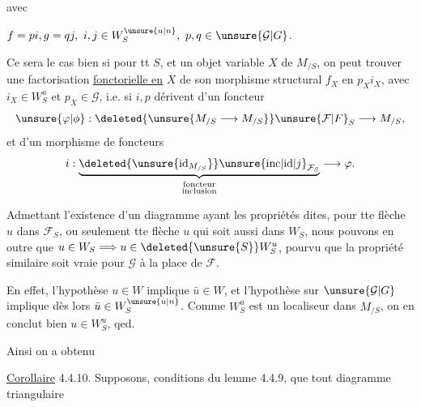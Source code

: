avec


$f=pi,g=qj,\ i,j\in W_S^{\unsure{u|n}},\ p,q\in\unsure{\mathcal{G}|G}$.

Ce sera le cas  bien  si pour tt $S$,  et un objet variable $X$ de $M_{/S}$, on peut trouver une factorisation \uline{fonctorielle en} $X$ de son morphisme structural $f_X$ en $p_X i_X$, avec $i_X\in W_S^u$ et $p_X\in\mathcal{G}$, i.e. si $i,p$ dérivent d'un foncteur
\[
 \unsure{\varphi|\phi}:\deleted{\unsure{M_{/S}\longrightarrow M_{/S}}}\unsure{\mathcal{F}|F}_S\longrightarrow M_{/S},
\]
et d'un morphisme de foncteurs
\[
 i:\underset{\substack{\text{foncteur}\\\text{inclusion}}}{\underbrace{\deleted{\unsure{\mathrm{id}_{M_{/S}}}}\unsure{\mathrm{inc}|\mathrm{id}|j}_{\mathcal{F}_S}}}\longrightarrow\varphi.
\]

Admettant l'existence d'un  diagramme ayant les propriétés dites, pour tte flèche $u$ dans $\mathcal{F}_S$, ou seulement tte flèche $u$ qui soit aussi dans $W_S$, nous pouvons  en outre que $u\in W_S\Longrightarrow u\in\deleted{\unsure{S}}W_S^u$, pourvu que la propriété similaire soit vraie pour $\mathcal{G}$ à la place de $\mathcal{F}$.

En effet,  l'hypothèse  $u\in W$ implique $\bar u\in W$, et l'hypothèse sur $\unsure{\mathcal{G}|G}$ implique dès lors $\bar u\in W_S^{\unsure{u|n}}$. Comme $W_S^u$ est un localiseur dans $M_{/S}$, on en conclut bien $u\in W_S^u$, qed.

Ainsi on a obtenu


\uline{Corollaire} 4.4.10. Supposons,  conditions  du lemme 4.4.9, que tout diagramme  triangulaire

